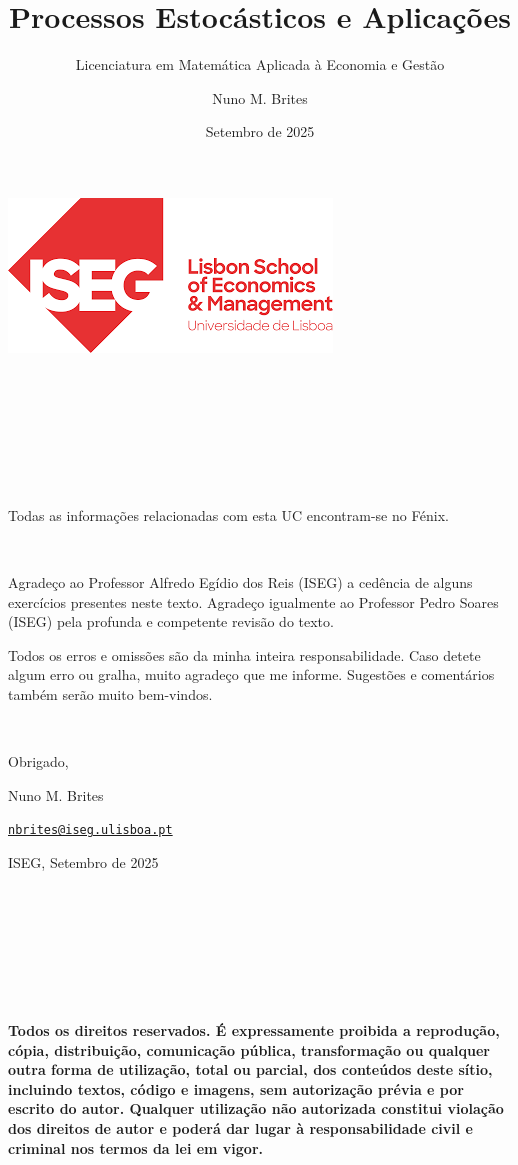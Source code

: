 \documentclass[
  11pt,
  a4paper,
]{book}
\title{Processos Estocásticos e Aplicações}
\subtitle{Licenciatura em Matemática Aplicada à Economia e Gestão}
\author{Nuno M. Brites}
\date{Setembro de 2025}
\theoremstyle{definition}
\theoremstyle{definition}
\theoremstyle{definition}
\theoremstyle{definition}
\theoremstyle{remark}
\begin{document}
\maketitle

{
\hypersetup{linkcolor=}
\setcounter{tocdepth}{2}
\tableofcontents
}
\chapter*{}\label{section}

\begin{center}\includegraphics[width=0.4\linewidth]{figures/iseg} \end{center}

\(\,\)

\(\,\)

\(\,\)

\(\,\)

Todas as informações relacionadas com esta UC encontram-se no Fénix.

\(\,\)

Agradeço ao Professor Alfredo Egídio dos Reis (ISEG) a cedência de alguns exercícios presentes neste texto. Agradeço igualmente ao Professor Pedro Soares (ISEG) pela profunda e competente revisão do texto.

Todos os erros e omissões são da minha inteira responsabilidade. Caso detete algum erro ou
gralha, muito agradeço que me informe. Sugestões e comentários também serão muito
bem-vindos.

\(\,\)

Obrigado,

Nuno M. Brites

\href{mailto:nbrites@iseg.ulisboa.pt}{\nolinkurl{nbrites@iseg.ulisboa.pt}}

ISEG, Setembro de 2025

\vfill

\(\,\)

\(\,\)

\(\,\)

\(\,\)

\textbf{Todos os direitos reservados. É expressamente proibida a reprodução, cópia, distribuição, comunicação pública, transformação ou qualquer outra forma de utilização, total ou parcial, dos conteúdos deste sítio, incluindo textos, código e imagens, sem autorização prévia e por escrito do autor. Qualquer utilização não autorizada constitui violação dos direitos de autor e poderá dar lugar à responsabilidade civil e criminal nos termos da lei em vigor.}
\end{document}
